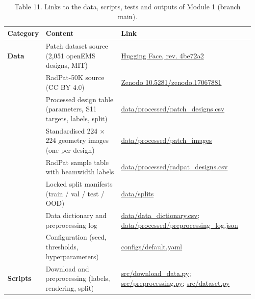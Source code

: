 \documentclass[11pt,a4paper]{article}
\begin{document}
\begin{table}[H]\centering\small
\caption*{Table 11. Links to the data, scripts, tests and outputs of Module 1 (branch main).}
\begin{tabularx}{\linewidth}{XXX}
\toprule
\textbf{Category} & \textbf{Content} & \textbf{Link} \\
\midrule
\textbf{Data} & Patch dataset source (2,051 openEMS designs, MIT) & \href{https://huggingface.co/datasets/becklabash/rectangular-patch-antenna-freq-response}{Hugging Face, rev. 4be72a2} \\
 & RadPat-50K source (CC BY 4.0) & \href{https://doi.org/10.5281/zenodo.17067881}{Zenodo 10.5281/zenodo.17067881} \\
 & Processed design table (parameters, S11 targets, labels, split) & \href{https://github.com/rathiabeth-sudo/901---module-1/blob/main/data/processed/patch_designs.csv}{data/processed/patch\_designs.csv} \\
 & Standardised 224 $\times$ 224 geometry images (one per design) & \href{https://github.com/rathiabeth-sudo/901---module-1/tree/main/data/processed/patch_images}{data/processed/patch\_images} \\
 & RadPat sample table with beamwidth labels & \href{https://github.com/rathiabeth-sudo/901---module-1/blob/main/data/processed/radpat_designs.csv}{data/processed/radpat\_designs.csv} \\
 & Locked split manifests (train / val / test / OOD) & \href{https://github.com/rathiabeth-sudo/901---module-1/tree/main/data/splits}{data/splits} \\
 & Data dictionary and preprocessing log & \href{https://github.com/rathiabeth-sudo/901---module-1/blob/main/data/data_dictionary.csv}{data/data\_dictionary.csv}; \href{https://github.com/rathiabeth-sudo/901---module-1/blob/main/data/processed/preprocessing_log.json}{data/processed/preprocessing\_log.json} \\
 & Configuration (seed, thresholds, hyperparameters) & \href{https://github.com/rathiabeth-sudo/901---module-1/blob/main/configs/default.yaml}{configs/default.yaml} \\
\textbf{Scripts} & Download and preprocessing (labels, rendering, split) & \href{https://github.com/rathiabeth-sudo/901---module-1/blob/main/src/download_data.py}{src/download\_data.py}; \href{https://github.com/rathiabeth-sudo/901---module-1/blob/main/src/preprocessing.py}{src/preprocessing.py}; \href{https://github.com/rathiabeth-sudo/901---module-1/blob/main/src/dataset.py}{src/dataset.py} \\

\end{tabularx}
\end{table}
\end{document}
